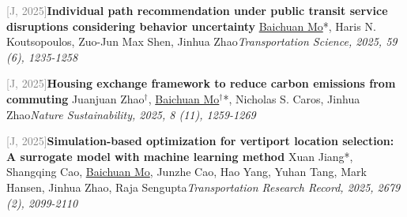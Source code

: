 \par\noindent\begin{minipage}{\linewidth}
{\textcolor{gray}{[J\themyCounter, 2025]\;}}{\textbf{Individual path recommendation under public transit service disruptions considering behavior uncertainty} \href{https://doi.org/10.1287/trsc.2025.0042}{\textcolor{cadmiumorange}{\faExternalLink}}}{\newline \underline{Baichuan Mo}*, Haris N. Koutsopoulos, Zuo-Jun Max Shen, Jinhua Zhao}{\newline \emph{Transportation Science, 2025, 59 (6), 1235-1258}}{{\;    }}{}
\end{minipage}\par\vspace{5.5pt}


\par\noindent\begin{minipage}{\linewidth}
{\textcolor{gray}{[J\themyCounter, 2025]\;}}{\textbf{Housing exchange framework to reduce carbon emissions from commuting} \href{https://doi.org/10.1038/s41893-025-01658-x}{\textcolor{cadmiumorange}{\faExternalLink}}}{\newline Juanjuan Zhao$^\dagger$, \underline{Baichuan Mo}$^\dagger$*, Nicholas S. Caros, Jinhua Zhao}{\newline \emph{Nature Sustainability, 2025, 8 (11), 1259-1269}}{{\;     }}{}
\end{minipage}\par\vspace{5.5pt}


\par\noindent\begin{minipage}{\linewidth}
{\textcolor{gray}{[J\themyCounter, 2025]\;}}{\textbf{Simulation-based optimization for vertiport location selection: A surrogate model with machine learning method} \href{https://doi.org/10.1177/03611981241277755}{\textcolor{cadmiumorange}{\faExternalLink}}}{\newline Xuan Jiang*, Shangqing Cao, \underline{Baichuan Mo}, Junzhe Cao, Hao Yang, Yuhan Tang, Mark Hansen, Jinhua Zhao, Raja Sengupta}{\newline \emph{Transportation Research Record, 2025, 2679 (2), 2099-2110}}{{\;    }}{}
\end{minipage}\par\vspace{5.5pt}


